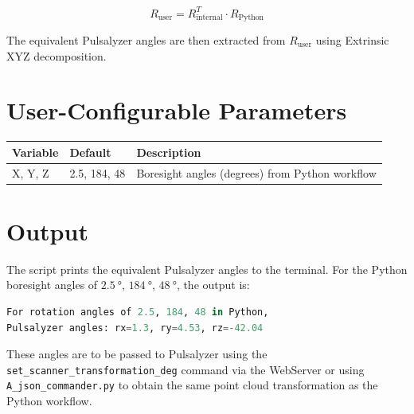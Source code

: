 \begin{equation*}
    R_{\text{user}} = R_{\text{internal}}^{T} \cdot R_{\text{Python}}
\end{equation*}

The equivalent Pulsalyzer angles are then extracted from $R_{\text{user}}$ using Extrinsic XYZ decomposition.

\section{User-Configurable Parameters}
\begin{table}[!ht]
    \centering
    \begin{tabularx}{\textwidth}{llX}
        \toprule
        Variable & Default      & Description                                     \\ \midrule
        X, Y, Z  & 2.5, 184, 48 & Boresight angles (degrees) from Python workflow \\ \bottomrule
    \end{tabularx}
\end{table}

\section{Output}

The script prints the equivalent Pulsalyzer angles to the terminal. For the Python boresight angles of $\qty{2.5}{\degree}$, $\qty{184}{\degree}$, $\qty{48}{\degree}$, the output is:

\begin{lstlisting}[language=Python, numbers=none]
For rotation angles of 2.5, 184, 48 in Python,
Pulsalyzer angles: rx=1.3, ry=4.53, rz=-42.04
\end{lstlisting}

These angles are to be passed to Pulsalyzer using the \texttt{set\_scanner\_transformation\_deg} command via the WebServer or using \texttt{A\_json\_commander.py} to obtain the same point cloud transformation as the Python workflow.